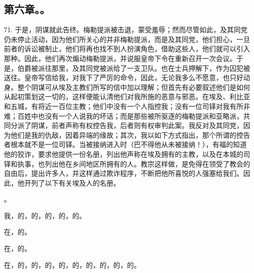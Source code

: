 \subsection{第六章。。}

71. 于是，阴谋就此告终。梅勒提派被击退，蒙受羞辱；然而尽管如此，及其同党仍未停止活动，因为他们所关心的并非梅勒提派，而是及其同党，他们担心，一旦前者的诉讼被制止，他们将再也找不到人扮演角色，借助这些人，他们就可以引入那种。因此，他们再次煽动梅勒提派，并说服皇帝下令在重新召开一次会议。于是，伯爵被派往那里，及其同党被派给了一支卫队。也在士兵押解下，作为囚犯被送往。皇帝写信给我，对我下了严厉的命令，因此，无论我多么不愿意，也只好动身。整个阴谋可从埃及主教们所写的信中加以理解；但首先有必要叙述他们是如何从起初策划这一切的，这样便能认清他们对我所施的恶意与邪恶。在埃及、利比亚和五城，有将近一百位主教；他们中没有一个人指控我；没有一位司铎对我有所非难；百姓中也没有一个人说我的坏话；而是那些被所驱逐的梅勒提派和亚略派，共同分派了阴谋，前者声称有权控告我，后者则有权审判此案。我反对及其同党，因为他们是我的仇敌，因着异端的缘故；其次，我以如下方式指出，那个所谓的控告者根本就不是一位司铎。当被接纳进入时（巴不得他从未被接纳！），有福的知道他的狡诈，要求他提供一份名册，列出他声称在埃及拥有的主教，以及在本城的司铎和执事，也列出他在乡间地区所拥有的人。教宗这样做，是免得在领受了教会的自由后，提出许多人，并这样通过欺诈程序，不断把他所喜悦的人强塞给我们。因此，他开列了以下有关埃及人的名册。\par

。\par

我，的，的，的，的，的。\par

在，的。\par

在，的。\par

在，的，的，的，的，的，的，的，的，的。\par

